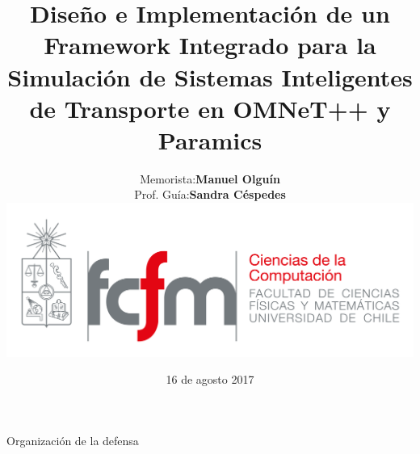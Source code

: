 \documentclass[aspectratio=169]{beamer}
\begin{document}
    
\title[]{Diseño e Implementación de un Framework Integrado para la Simulación de Sistemas Inteligentes de Transporte en OMNeT++ y Paramics}
\date{16 de agosto 2017}
\author[Olguín]{%
\begin{minipage}{.5\linewidth}
    \begin{tabular}{@{}ll@{}}
        Memorista:   & \textbf{Manuel Olguín}   \\
        Prof. Guía: & \textbf{Sandra Céspedes}  \\
    \end{tabular}
\end{minipage}%
\begin{minipage}{.5\linewidth}
    \centering
    \includegraphics[width=\linewidth]{figuras/fcfm_dcc_png.png}
\end{minipage}  
}

\begin{frame}
\titlepage
\end{frame}



\begin{frame}{Organización de la defensa}
\tableofcontents
\note{
    \tableofcontents
}
\end{frame}
\end{document}
